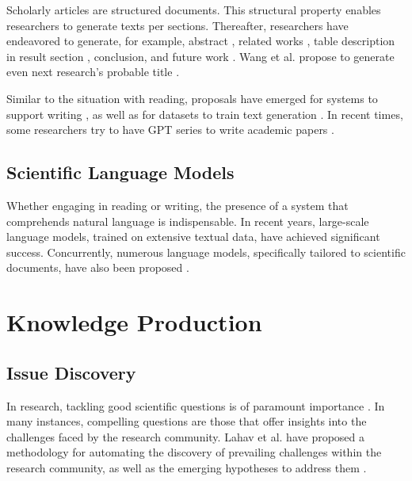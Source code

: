 \documentclass{book}
\begin{document}
Scholarly articles are structured documents. This structural property enables researchers to generate texts per sections. Thereafter, 
researchers have endeavored to generate, for example, abstract \cite{kumarasinghe2022automatic,gao2022comparing,wang2019paperrobot}, related works \cite{li2022automatic,shah2021generating}, table description in result section \cite{moosavi2021scigen,moosavi2021learning}, conclusion, and future work \cite{wang2019paperrobot}. Wang et al. propose to generate even next research's probable title \cite{wang2019paperrobot}.

Similar to the situation with reading, proposals have emerged for systems to support writing \cite{narimatsu2021task}, as well as for datasets to train text generation \cite{chen2021scixgen}. In recent times, some researchers try to have GPT series to write academic papers \cite{transformer2022can}. 

\subsection{Scientific Language Models}

Whether engaging in reading or writing, the presence of a system that comprehends natural language is indispensable. In recent years, large-scale language models, trained on extensive textual data, have achieved significant success. Concurrently, numerous language models, specifically tailored to scientific documents, have also been proposed \cite{beltagy2019scibert,singh2022scirepeval,nadkarni2021scientific,cohan2020specter,gupta2022matscibert,taylor2022galactica}.

\section{Knowledge Production}


\subsection{Issue Discovery}
In research, tackling good scientific questions is of paramount importance \cite{alon2009choose}. In many instances, compelling questions are those that offer insights into the challenges faced by the research community. Lahav et al. have proposed a methodology for automating the discovery of prevailing challenges within the research community, as well as the emerging hypotheses to address them \cite{lahav2022search}.
\end{document}
